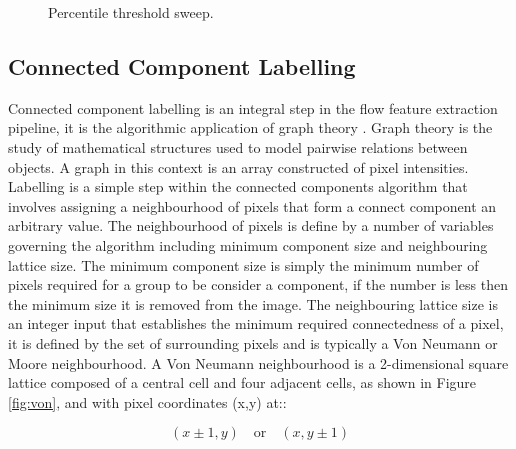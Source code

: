 \begin{figure}[H]
  \hfill
  \caption{Percentile threshold sweep.}
  \label{fig:percentile}
\end{figure}

\subsection{Connected Component Labelling}
Connected component labelling is an integral step in the flow feature extraction pipeline, it is the algorithmic application of graph theory \citep{rosenfeld1966sequential}. Graph theory is the study of mathematical structures used to model pairwise relations between objects. A graph in this context is an array constructed of pixel intensities. Labelling is a simple step within the connected components algorithm that involves assigning a neighbourhood of pixels that form a connect component an arbitrary value. The neighbourhood of pixels is define by a number of variables governing the algorithm including minimum component size and neighbouring lattice size. The minimum component size is simply the minimum number of pixels required for a group to be consider a component, if the number is less then the minimum size it is removed from the image. The neighbouring lattice size is an integer input that establishes the minimum required connectedness of a pixel, it is defined by the set of surrounding pixels and is typically a Von Neumann \citep{weisstein2013neumann} or Moore \citep{sharma2013edge} neighbourhood. A Von Neumann neighbourhood is a 2-dimensional square lattice composed of a central cell and four adjacent cells, as shown in Figure \ref{fig:von}, and with pixel coordinates (x,y) at::

\begin{equation}
(x\pm1,y) \quad \textrm{or} \quad (x,y\pm1)
\end{equation}

